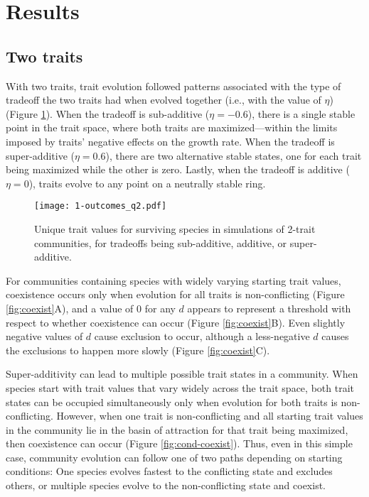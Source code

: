 \section*{Results}

\subsection*{Two traits}

With two traits, trait evolution followed patterns associated with the type 
of tradeoff the two traits had when evolved together
(i.e., with the value of $\eta$)
(Figure \ref{fig:two-trait-outcomes}).
When the tradeoff is sub-additive ($\eta = -0.6$), there is a single
stable point in the trait space, where both traits are
maximized---within the limits imposed by traits' negative effects on 
the growth rate.
When the tradeoff is super-additive ($\eta = 0.6$), there are two
alternative stable states, one for each trait being maximized while the 
other is zero.
Lastly, when the tradeoff is additive ($\eta = 0$), traits
evolve to any point on a neutrally stable ring.


\begin{figure}[ht!]
\centering
\texttt{[image: 1-outcomes\_q2.pdf]}
\caption{Unique trait values for surviving species in simulations of 2-trait communities,
    for tradeoffs being sub-additive, additive, or super-additive.}
\label{fig:two-trait-outcomes}
\end{figure}


For communities containing species with widely varying starting trait values,
coexistence occurs only when evolution for all traits is non-conflicting
(Figure \ref{fig:coexist}A),
and a value of 0 for any $d$ appears to represent a threshold with respect 
to whether coexistence can occur (Figure \ref{fig:coexist}B).
Even slightly negative values of $d$ cause exclusion to occur, although
a less-negative $d$ causes the exclusions to happen more slowly
(Figure \ref{fig:coexist}C).



Super-additivity can lead to multiple possible trait states in a 
community.
When species start with trait values that vary widely 
across the trait space, both trait states can be occupied 
simultaneously only when evolution for both traits is non-conflicting.
However, when one trait is non-conflicting and all starting
trait values in the community lie in the basin of attraction
for that trait being maximized, then coexistence can occur
(Figure \ref{fig:cond-coexist}).
Thus, even in this simple case, community evolution can follow
one of two paths depending on starting conditions:
One species evolves fastest to the conflicting state and 
excludes others, or
multiple species evolve to the non-conflicting state
and coexist.


